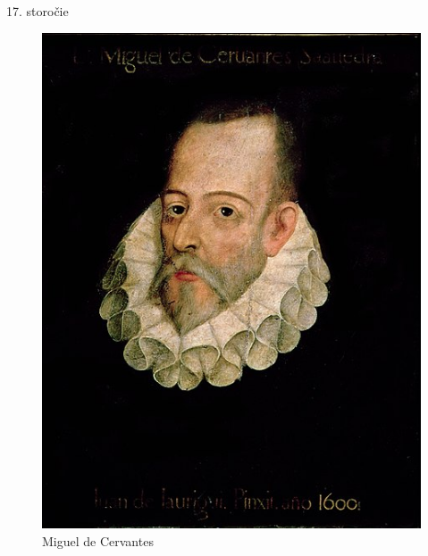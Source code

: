 \documentclass[dvipsnames]{beamer}
\begin{document}
\begin{frame}{17. storočie}
\begin{itemize}
\begin{minipage}[t]{0.6\textwidth}
			      \begin{figure}
				      \includegraphics[scale=0.1605]{cervo}
				      \caption{Miguel de Cervantes}
			      \end{figure}
		      \end{minipage}
	\end{itemize}
\end{frame}
\end{document}
